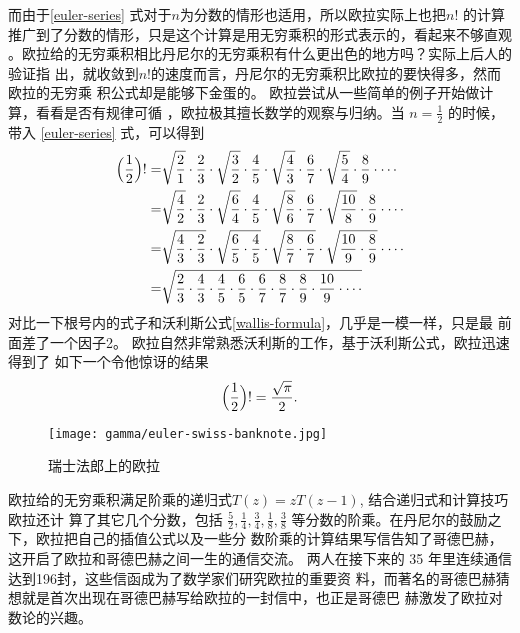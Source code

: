 而由于\eqref{euler-series} 式对于$n$为分数的情形也适用，所以欧拉实际上也把$n!$
的计算推广到了分数的情形，只是这个计算是用无穷乘积的形式表示的，看起来不够直观
。欧拉给的无穷乘积相比丹尼尔的无穷乘积有什么更出色的地方吗？实际上后人的验证指
出，就收敛到$n!$的速度而言，丹尼尔的无穷乘积比欧拉的要快得多，然而欧拉的无穷乘
积公式却是能够下金蛋的。 欧拉尝试从一些简单的例子开始做计算，看看是否有规律可循
，欧拉极其擅长数学的观察与归纳。当 $n=\frac{1}{2}$ 的时候，带入
\eqref{euler-series} 式，可以得到
\begin{align*}
\Bigl(\frac{1}{2}\Bigr)! 
= & \sqrt{\frac{2}{1}} \cdot \frac{2}{3} \cdot \sqrt{\frac{3}{2}} \cdot \frac{4}{5} 
    \cdot \sqrt{\frac{4}{3}} \cdot \frac{6}{7} \cdot \sqrt{\frac{5}{4}} \cdot \frac{8}{9} 
    \cdot \cdots  \\
= & \sqrt{\frac{4}{2}} \cdot \frac{2}{3} \cdot \sqrt{\frac{6}{4}} \cdot \frac{4}{5}
    \cdot \sqrt{\frac{8}{6}} \cdot \frac{6}{7} \cdot \sqrt{\frac{10}{8}} \cdot \frac{8}{9} 
    \cdot \cdots  \\
= & \sqrt{\frac{4}{3} \cdot \frac{2}{3}} \cdot \sqrt{\frac{6}{5} \cdot \frac{4}{5}}
    \cdot \sqrt{\frac{8}{7} \cdot \frac{6}{7}} \cdot \sqrt{\frac{10}{9} \cdot \frac{8}{9}} 
    \cdot \cdots  \\
= & \sqrt{\frac{2}{3} \cdot \frac{4}{3} \cdot \frac{4}{5} \cdot \frac{6}{5}
    \cdot \frac{6}{7} \cdot \frac{8}{7} \cdot \frac{8}{9} \cdot \frac{10}{9} \cdot \cdots } 
\end{align*}
对比一下根号内的式子和沃利斯公式\eqref{wallis-formula}，几乎是一模一样，只是最
前面差了一个因子2。 欧拉自然非常熟悉沃利斯的工作，基于沃利斯公式，欧拉迅速得到了
如下一个令他惊讶的结果
$$ \Bigl(\frac{1}{2}\Bigr)! = \frac{\sqrt{\pi}}{2} .$$

\begin{figure}[htbp]
\centering
\texttt{[image: gamma/euler-swiss-banknote.jpg]}
\caption{瑞士法郎上的欧拉}
\end{figure}

欧拉给的无穷乘积满足阶乘的递归式$T(z) = z T(z-1)$, 结合递归式和计算技巧欧拉还计
算了其它几个分数，包括 $\frac{5}{2}, \frac{1}{4}, \frac{3}{4}, \frac{1}{8},
\frac{3}{8} $ 等分数的阶乘。在丹尼尔的鼓励之下，欧拉把自己的插值公式以及一些分
数阶乘的计算结果写信告知了哥德巴赫，这开启了欧拉和哥德巴赫之间一生的通信交流。
两人在接下来的 35 年里连续通信达到196封，这些信函成为了数学家们研究欧拉的重要资
料，而著名的哥德巴赫猜想就是首次出现在哥德巴赫写给欧拉的一封信中，也正是哥德巴
赫激发了欧拉对数论的兴趣。

